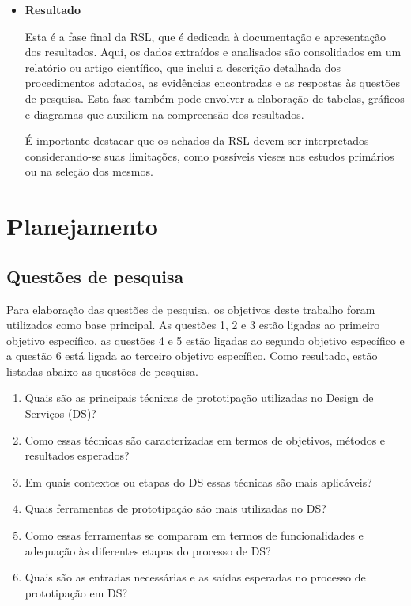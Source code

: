 \begin{itemize}
	\item \textbf{Resultado}
	
	Esta é a fase final da RSL, que é dedicada à documentação e apresentação dos resultados. Aqui, os dados extraídos e analisados são consolidados em um relatório ou artigo científico, que inclui a descrição detalhada dos procedimentos adotados, as evidências encontradas e as respostas às questões de pesquisa. Esta fase também pode envolver a elaboração de tabelas, gráficos e diagramas que auxiliem na compreensão dos resultados.
	
	É importante destacar que os achados da RSL devem ser interpretados considerando-se suas limitações, como possíveis vieses nos estudos primários ou na seleção dos mesmos.
	
\end{itemize}

\section{Planejamento}

\subsection{Questões de pesquisa}

Para elaboração das questões de pesquisa, os objetivos deste trabalho foram utilizados como base principal. As questões 1, 2 e 3 estão ligadas ao primeiro objetivo específico, as questões 4 e 5 estão ligadas ao segundo objetivo específico e a questão 6 está ligada ao terceiro objetivo específico. Como resultado, estão listadas abaixo as questões de pesquisa.


\begin{enumerate}
	
	\item Quais são as principais técnicas de prototipação utilizadas no Design de Serviços (DS)?
	\item Como essas técnicas são caracterizadas em termos de objetivos, métodos e resultados esperados?
	\item Em quais contextos ou etapas do DS essas técnicas são mais aplicáveis?
	
	\item Quais ferramentas de prototipação são mais utilizadas no DS?
	\item Como essas ferramentas se comparam em termos de funcionalidades e adequação às diferentes etapas do processo de DS?
	
	\item Quais são as entradas necessárias e as saídas esperadas no processo de prototipação em DS?
	
\end{enumerate}

